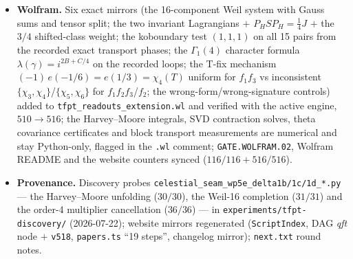 \documentclass[11pt]{article}
\begin{document}
\begin{itemize}[leftmargin=1.5em]
\texttt{v518\_celestial\_wp5e\_delta1\_derived\_kill.py} is cited via \texttt{veri} in
\texttt{tfpt\_research\_contracts} and \texttt{tfpt\_3}.
\item \textbf{Wolfram.} Six exact mirrors (the 16-component Weil system with Gauss sums and
tensor split; the two invariant Lagrangians $+$ $P_HSP_H=\tfrac14J$ $+$ the $3/4$
shifted-class weight; the koboundary test $(1,1,1)$ on all 15 pairs from the recorded exact
transport phases; the $\Gamma_1(4)$ character formula $\lambda(\gamma)=i^{2B+C/4}$ on the
recorded loops; the T-fix mechanism $(-1)\,e(-1/6)=e(1/3)=\chi_4(T)$ uniform for $f_1f_3$ vs
inconsistent $\{\chi_3,\chi_4\}$/$\{\chi_5,\chi_6\}$ for $f_1f_2f_3$/$f_2$; the
wrong-form/wrong-signature controls) added to \texttt{tfpt\_readouts\_extension.wl} and
verified with the active engine, $510\to516$; the Harvey--Moore integrals, SVD contraction
solves, theta covariance certificates and block transport measurements are numerical and stay
Python-only, flagged in the \texttt{.wl} comment; \texttt{GATE.WOLFRAM.02}, Wolfram README and
the website counters synced ($116/116+516/516$).
\item \textbf{Provenance.} Discovery probes
\texttt{celestial\_seam\_wp5e\_delta1b/1c/1d\_*.py} --- the Harvey--Moore unfolding
($30/30$), the Weil-16 completion ($31/31$) and the order-4 multiplier cancellation
($36/36$) --- in \texttt{experiments/tfpt-discovery/} (2026-07-22); website mirrors
regenerated (\texttt{ScriptIndex}, DAG \emph{qft} node $+$ \texttt{v518},
\texttt{papers.ts} ``19 steps'', changelog mirror); \texttt{next.txt} round notes.
\end{itemize}
\end{document}

